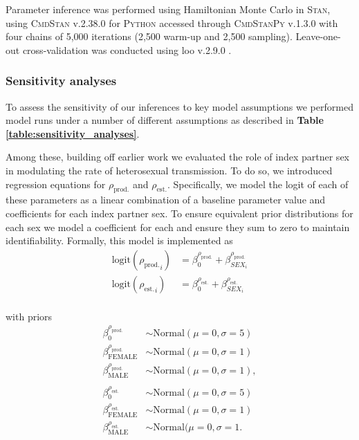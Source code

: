 \documentclass{article}[11pt]
\begin{document}
Parameter inference was performed using Hamiltonian Monte Carlo in \textsc{Stan}, using \textsc{CmdStan} v.2.38.0  for \textsc{Python} accessed through \textsc{CmdStanPy} v.1.3.0  with four chains of 5,000 iterations (2,500 warm-up and 2,500 sampling). Leave-one-out cross-validation was conducted using loo v.2.9.0 .  

\subsubsection*{Sensitivity analyses}

To assess the sensitivity of our inferences to key model assumptions we performed model runs under a number of different assumptions as described in \textbf{Table \ref{table:sensitivity_analyses}}. 

Among these, building off earlier work \cite{quinn2000, blanquart2016} we evaluated the role of index partner sex in modulating the rate of heterosexual transmission. To do so, we introduced regression equations for $\rho_\text{prod.}$ and $\rho_\text{est.}$. Specifically, we model the logit of each of these parameters as a linear combination of a baseline parameter value and coefficients for each index partner sex. To ensure equivalent prior distributions for each sex we model a coefficient for each and ensure they sum to zero to maintain identifiability. Formally, this model is implemented as
\begin{align}
\text{logit}({\rho_\text{prod.}}_i) &= \beta^{\rho_\text{prod.}}_0 + \beta^{\rho_\text{prod.}}_{SEX_i} \\
\text{logit}({\rho_\text{est.}}_i) &= \beta^{\rho_\text{est.}}_0 + \beta^{\rho_\text{est.}}_{SEX_i} \\
\end{align}

with priors 
\begin{align}
\beta^{\rho_\text{prod.}}_0 &\sim \text{Normal}(\mu=0, \sigma=5) \\
\beta^{\rho_\text{prod.}}_\text{FEMALE} &\sim \text{Normal}(\mu=0, \sigma=1) \\
\beta^{\rho_\text{prod.}}_\text{MALE} &\sim \text{Normal}(\mu=0, \sigma=1), \\ \\
\beta^{\rho_\text{est.}}_0 &\sim \text{Normal}(\mu=0, \sigma=5) \\
\beta^{\rho_\text{est.}}_\text{FEMALE} &\sim \text{Normal}(\mu=0, \sigma=1) \\
\beta^{\rho_\text{est.}}_\text{MALE} &\sim \text{Normal}(\mu=0, \sigma=1.
\end{align}
\end{document}

